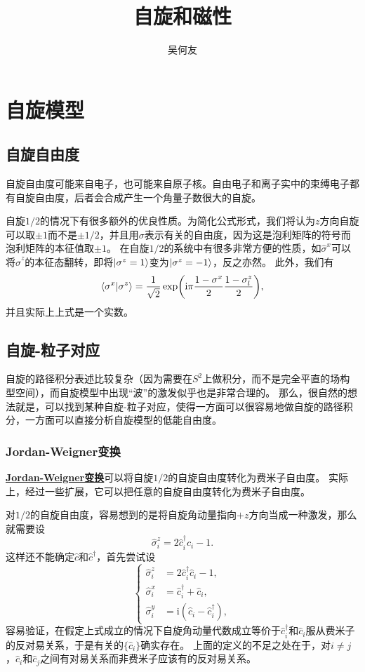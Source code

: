 \documentclass[hyperref, UTF8, a4paper]{ctexart}
\title{自旋和磁性}
\author{吴何友}
\newcommand*{\ii}{\mathrm{i}}
\newcommand*{\concept}[1]{\underline{\textbf{#1}}}
\begin{document}
\maketitle

\section{自旋模型}

\subsection{自旋自由度}

自旋自由度可能来自电子，也可能来自原子核。自由电子和离子实中的束缚电子都有自旋自由度，后者会合成产生一个角量子数很大的自旋。

自旋$1/2$的情况下有很多额外的优良性质。为简化公式形式，我们将认为$z$方向自旋可以取$\pm 1$而不是$\pm 1/2$，并且用$\sigma$表示有关的自由度，因为这是泡利矩阵的符号而泡利矩阵的本征值取$\pm 1$。
在自旋$1/2$的系统中有很多非常方便的性质，如$\hat{\sigma}^x$可以将$\hat{\sigma}^z$的本征态翻转，即将$\ket{\sigma^z=1}$变为$\ket{\sigma^z=-1}$，反之亦然。
此外，我们有
\begin{equation}
    \braket{\sigma^x}{\sigma^z} = \frac{1}{\sqrt{2}} \exp(\ii \pi \frac{1 - \sigma^x}{2} \frac{1 - \sigma^z_l}{2}),
\end{equation}
并且实际上上式是一个实数。

\subsection{自旋-粒子对应}

自旋的路径积分表述比较复杂（因为需要在$S^2$上做积分，而不是完全平直的场构型空间），而自旋模型中出现“波”的激发似乎也是非常合理的。
那么，很自然的想法就是，可以找到某种自旋-粒子对应，使得一方面可以很容易地做自旋的路径积分，一方面可以直接分析自旋模型的低能自由度。

\subsubsection{Jordan-Weigner变换}

\concept{Jordan-Weigner变换}可以将自旋$1/2$的自旋自由度转化为费米子自由度。
实际上，经过一些扩展，它可以把任意的自旋自由度转化为费米子自由度。

对$1/2$的自旋自由度，容易想到的是将自旋角动量指向$+z$方向当成一种激发，那么就需要设
\[
    \hat{\sigma}^z_i = 2 \hat{c}^\dagger_i \hat{c}_i - 1.
\]
这样还不能确定$\hat{c}$和$\hat{c}^\dagger$，首先尝试设
\[
    \left\{
        \begin{aligned}
            \hat{\sigma}^z_i &= 2 \hat{c}^\dagger_i \hat{c}_i - 1, \\
            \hat{\sigma}^x_i &= \hat{c}^\dagger_i + \hat{c}_i, \\
            \hat{\sigma}^y_i &= \ii (\hat{c}_i - \hat{c}^\dagger_i),
        \end{aligned}
    \right.
\]
容易验证，在假定上式成立的情况下自旋角动量代数成立等价于$\hat{c}_i^\dagger$和$\hat{c}_i$服从费米子的反对易关系，于是有关的$\{\hat{c}_i\}$确实存在。
上面的定义的不足之处在于，对$i \neq j$，$\hat{c}_i$和$\hat{c}_j$之间有对易关系而非费米子应该有的反对易关系。
\end{document}
